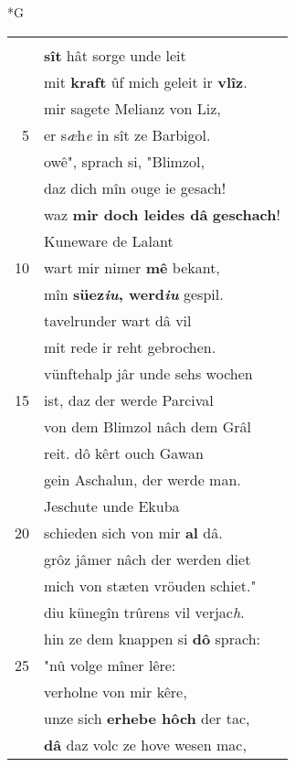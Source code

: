 \documentclass[8pt,a4paper,notitlepage]{article}
\begin{document}
\begin{table}[ht]
\begin{minipage}[t]{0.5\linewidth}
\small
\begin{center}*G
\end{center}
\begin{tabular}{rl}
 & \textbf{\begin{large}D\end{large}az} Gawan von Artuse reit,\\ 
 & \textbf{sît} hât sorge unde leit\\ 
 & mit \textbf{kraft} ûf mich geleit ir \textbf{vlîz}.\\ 
 & mir sagete Melianz von Liz,\\ 
5 & er s\textit{æ}h\textit{e} in sît ze Barbigol.\\ 
 & owê", sprach si, "Blimzol,\\ 
 & daz dich mîn ouge ie gesach!\\ 
 & waz \textbf{mir doch leides dâ} \textbf{geschach}!\\ 
 & Kuneware de Lalant\\ 
10 & wart mir nimer \textbf{mê} bekant,\\ 
 & mîn \textbf{süez\textit{iu}, werd\textit{iu}} gespil.\\ 
 & tavelrunder wart dâ vil\\ 
 & mit rede ir reht gebrochen.\\ 
 & vünftehalp jâr unde sehs wochen\\ 
15 & ist, daz der werde Parcival\\ 
 & von dem Blimzol nâch dem Grâl\\ 
 & reit. dô kêrt ouch Gawan\\ 
 & gein Aschalun, der werde man.\\ 
 & Jeschute unde Ekuba\\ 
20 & schieden sich von mir \textbf{al} dâ.\\ 
 & grôz jâmer nâch der werden diet\\ 
 & mich von stæten vröuden schiet."\\ 
 & diu künegîn trûrens vil verjac\textit{h}.\\ 
 & hin ze dem knappen si \textbf{dô} sprach:\\ 
25 & "nû volge mîner lêre:\\ 
 & verholne von mir kêre,\\ 
 & unze sich \textbf{erhebe hôch} der tac,\\ 
 & \textbf{dâ} daz volc ze hove wesen mac,\\ 

\end{tabular}
\end{minipage}
\end{table}
\end{document}
